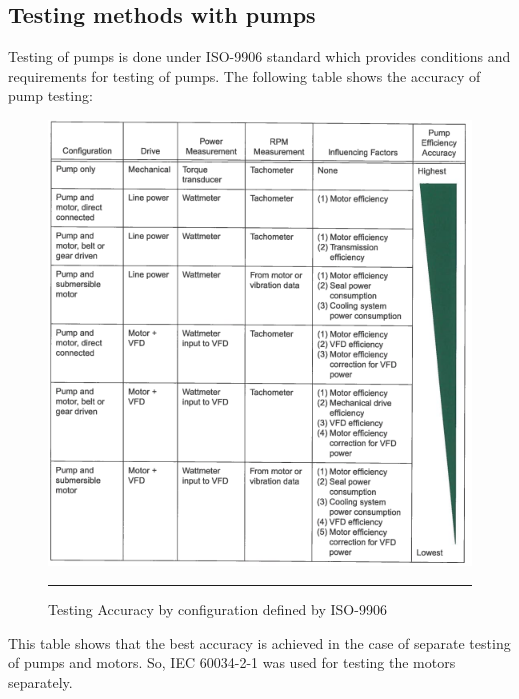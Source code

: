 \subsection{Testing methods with pumps}
Testing of pumps is done under ISO-9906 standard which provides conditions and requirements for testing of pumps. The following table shows the accuracy of pump testing:
\begin{figure}[htbp]
	\centering
		\includegraphics[width = 5.5in]{./Figures/MS/25.png}
		\rule{35em}{0.5pt}
	\caption{Testing Accuracy by configuration defined by ISO-9906}
	\label{fig:Testing Accuracy by configuration defined by ISO-9906}
\end{figure}
This table shows that the best accuracy is achieved in the case of separate testing of pumps and motors. So, IEC 60034-2-1 was used for testing the motors separately.